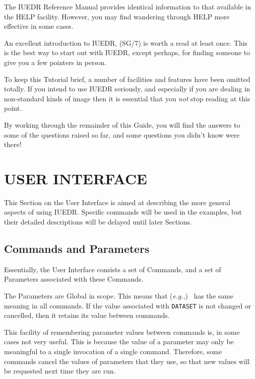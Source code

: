 The IUEDR Reference Manual  provides identical information
to that available in the HELP facility.  However, you may find wandering
through HELP more effective in some cases.

An excellent introduction to IUEDR,  (SG/7)
is worth a read at least once.  This is the best way to start out with IUEDR,
except perhaps, for finding someone to give you a few pointers in person.

To keep this Tutorial brief, a number of facilities and features have been
omitted totally.  If you intend to use IUEDR seriously, and especially if you
are dealing in non-standard kinds of image then it is essential that you {\em
not} stop reading at this point.

By working through the remainder of this Guide, you will find the answers to
some of the questions raised so far, and some questions you didn't know were
there!


\section{\label{se:user_int}USER INTERFACE}

This Section on the User Interface is aimed at describing the more general
aspects of using IUEDR\@.  Specific commands will be used in the examples, but
their detailed descriptions will be delayed until later Sections.


\subsection{Commands and Parameters}

Essentially, the User Interface consists a set of Commands, and a set of
Parameters associated with these Commands.

The Parameters are Global in scope.  This means that
({\it{e.g.,}})\ 
 has the same meaning in all commands.  If the value
associated with \verb+DATASET+ is not changed or cancelled, then it retains
its value between commands.

This facility of remembering parameter values between commands is, in some
cases not very useful.  This is because the value of a parameter may only be
meaningful to a single invocation of a single command.  Therefore, some
commands cancel the values of parameters that they use, so that new values
will be requested next time they are run.

